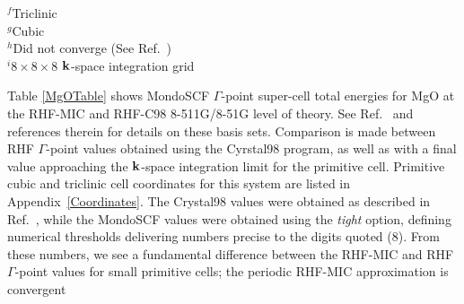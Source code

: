 \documentclass[prb,aps,nobibnotes,twocolumn,doublespace,twocolumngrid,superbib]{revtex4}
\begin{document}
\begin{table}[h]
\caption{Progression of Hartree-Fock $\Gamma$-point super-cell calculations 
for MgO using the periodic RHF-MIC and RHF 8-511G/8-51G level of theory.  Comparison is 
made to a final value approaching the ${\bf k}$-space integration limit for the primitive cell.}
\label{MgOTable}
\raggedright{
{\hskip 0.330in}$^f$Triclinic \\
{\hskip 0.330in}$^g$Cubic \\
{\hskip 0.330in}$^h$Did not converge (See Ref.~\cite{BCivalleri02}) \\
{\hskip 0.330in}$^i 8\times8\times8$ ${\bf k}$-space integration grid  \\}
\end{table}

Table \ref{MgOTable} shows {\sc MondoSCF} $\Gamma$-point super-cell total energies for MgO 
at the RHF-MIC and RHF-C98 8-511G/8-51G level of theory.  See Ref.~\cite{TowlerLib} and 
references therein for details on these basis sets.  Comparison is made between RHF
$\Gamma$-point values obtained using the {\sc Cyrstal98} program, as well as with a final value 
approaching the ${\bf k}$-space integration limit for the primitive cell. 
Primitive cubic and triclinic cell coordinates for this system are listed in Appendix~\ref{Coordinates}.
The {\sc Crystal98} values were obtained as described in Ref.~\cite{BCivalleri02}, while the 
{\sc MondoSCF} values were obtained using the {\it tight} option, defining numerical thresholds 
delivering numbers precise to the digits quoted (8).  From these numbers, we see a fundamental 
difference between the RHF-MIC and RHF $\Gamma$-point values for small primitive cells; 
the periodic RHF-MIC approximation is convergent 
\end{document}
